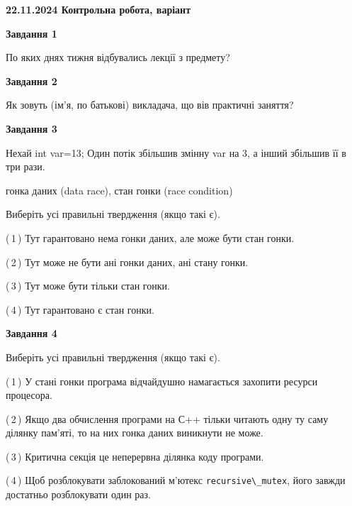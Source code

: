 \documentclass[12pt, ukrainian]{article}
\def\code#1{\Verb!#1!}
\begin{document}
\begin {large}

\textbf{22.11.2024 Контрольна робота, варіант  }\par


{

\begin{center}
\textbf{Завдання 1}
\end{center}

По яких днях тижня відбувались лекції з предмету?


\begin{center}
\textbf{Завдання 2}
\end{center}

Як зовуть (ім'я, по батькові) викладача, що вів практичні заняття?


\begin{center}
\textbf{Завдання 3}
\end{center}

Нехай int var=13; Один потік збільшив змінну var на 3, а інший збільшив її в три рази.

гонка даних (data race), стан гонки (race condition)

Виберіть усі правильні твердження (якщо такі є).\par
\vspace{2mm}
(\,1\,) Тут гарантовано нема гонки даних, але може бути стан гонки.%

(\,2\,) Тут може не бути ані гонки даних, ані стану гонки.%

(\,3\,) Тут може бути тільки стан гонки.%

(\,4\,) Тут гарантовано є стан гонки.%


\begin{center}
\textbf{Завдання 4}
\end{center}

Виберіть усі правильні твердження (якщо такі є).\par
\vspace{2mm}

(\,1\,) У стані гонки програма відчайдушно намагається захопити ресурси процесора.%

(\,2\,) Якщо два обчислення програми на С++ тільки читають одну ту саму ділянку пам'яті, то на них гонка даних  виникнути не може.%

(\,3\,) Критична секція це неперервна ділянка коду програми.%

(\,4\,) Щоб розблокувати заблокований м’ютекс \code{recursive\_mutex}, його завжди достатньо розблокувати один раз.%


}
\end{large}
\end{document}
